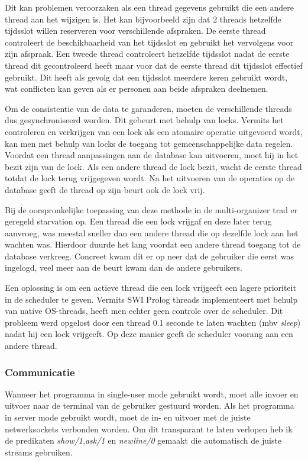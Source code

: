 \documentclass[a4paper]{article}
\begin{document}
Dit kan problemen veroorzaken als een thread gegevens gebruikt die een andere thread aan het wijzigen is.
Het kan bijvoorbeeld zijn dat 2 threads hetzelfde tijdsslot willen reserveren voor verschillende afspraken.
De eerste thread controleert de beschikbaarheid van het tijdsslot en gebruikt het vervolgens voor zijn afspraak.
Een tweede thread controleert hetzelfde tijdsslot nadat de eerste thread dit gecontroleerd heeft maar voor dat de eerste thread dit tijdsslot effectief gebruikt.
Dit heeft als gevolg dat een tijdsslot meerdere keren gebruikt wordt, wat conflicten kan geven als er personen aan beide afspraken deelnemen.

Om de consistentie van de data te garanderen, moeten de verschillende threads dus gesynchroniseerd worden.
Dit gebeurt met behulp van locks. Vermits het controleren en verkrijgen van een lock als een atomaire operatie uitgevoerd wordt, kan men met behulp van locks de toegang tot gemeenschappelijke data regelen.
Voordat een thread aanpassingen aan de database kan uitvoeren, moet hij in het bezit zijn van de lock.
Als een andere thread de lock bezit, wacht de eerste thread totdat de lock terug vrijgegeven wordt.
Na het uitvoeren van de operaties op de database geeft de thread op zijn beurt ook de lock vrij.

Bij de oorspronkelijke toepassing van deze methode in de multi-organizer trad er geregeld starvation op.
Een thread die een lock vrijgaf en deze later terug aanvroeg, was meestal sneller dan een andere thread die op dezelfde lock aan het wachten was.
Hierdoor duurde het lang voordat een andere thread toegang tot de database verkreeg.
Concreet kwam dit er op neer dat de gebruiker die eerst was ingelogd, veel meer aan de beurt kwam dan de andere gebruikers.

Een oplossing is om een actieve thread die een lock vrijgeeft een lagere prioriteit in de scheduler te geven.
Vermits SWI Prolog threads implementeert met behulp van native OS-threads, heeft men echter geen controle over de scheduler.
Dit probleem werd opgelost door een thread 0.1 seconde te laten wachten (mbv {\em sleep}) nadat hij een lock vrijgeeft.
Op deze manier geeft de scheduler voorang aan een andere thread.


\subsubsection{Communicatie}
Wanneer het programma in single-user mode gebruikt wordt, moet alle invoer en uitvoer naar de terminal van de gebruiker gestuurd worden.
Als het programma in server mode gebruikt wordt, moet de in- en uitvoer met de juiste netwerksockets verbonden worden.
Om dit transparant te laten verlopen heb ik de predikaten {\em show/1},{\em ask/1} en {\em newline/0} gemaakt die automatisch de juiste streams gebruiken.
\end{document}
